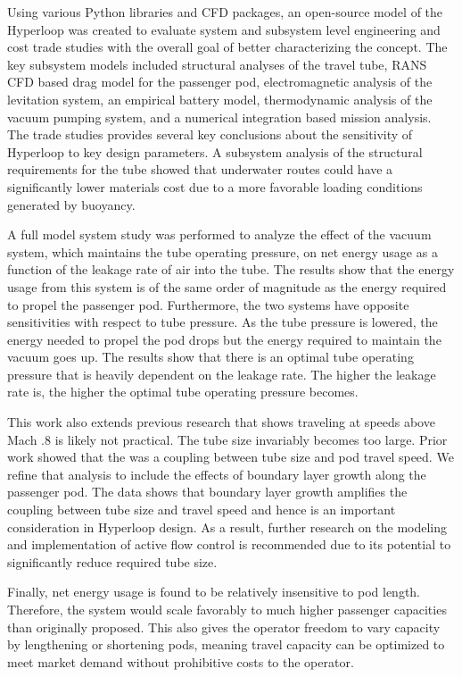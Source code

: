 Using various Python libraries and CFD packages, an open-source model of the Hyperloop was created to
evaluate system and subsystem level engineering and cost trade studies with
the overall goal of better characterizing the concept. The key subsystem
models included structural analyses of the travel tube, RANS CFD based drag
model for the passenger pod, electromagnetic analysis of the levitation
system, an empirical battery model, thermodynamic analysis of the vacuum
pumping system, and a numerical integration based mission analysis. The trade
studies provides several key conclusions about the sensitivity of Hyperloop to
key design parameters. A subsystem analysis of the structural requirements
for the tube showed that underwater routes could have a significantly lower
materials cost due to a more favorable loading conditions generated by
buoyancy.

A full model system study was performed to analyze the effect of the vacuum
system, which maintains the tube operating pressure, on net energy usage as a
function of the leakage rate of air into the tube. The results show that the
energy usage from this system is of the same order of magnitude as the energy
required to propel the passenger pod. Furthermore, the two systems have
opposite sensitivities with respect to tube pressure. As the tube pressure is
lowered, the energy needed to propel the pod drops but the energy required to
maintain the vacuum goes up. The results show that there is
an optimal tube operating pressure that is heavily dependent on the leakage
rate. The higher the leakage rate is, the higher the optimal tube operating
pressure becomes.

This work also extends previous research that shows traveling at speeds above
Mach .8 is likely not practical. The tube size invariably becomes too large.
Prior work showed that the was a coupling between tube size and pod travel
speed. We refine that analysis to include the effects of boundary layer growth
along the passenger pod. The data shows that boundary layer growth amplifies
the coupling between tube size and travel speed and hence is an important
consideration in Hyperloop design. As a result, further research on the
modeling and implementation of active flow control is recommended due to its
potential to significantly reduce required tube size.

Finally, net energy usage is found to be relatively insensitive to pod length.
Therefore, the system would scale favorably to much higher passenger
capacities than originally proposed.
This also gives the operator freedom to vary capacity by lengthening or
shortening pods, meaning travel capacity can be optimized to meet market demand
without prohibitive costs to the operator.

